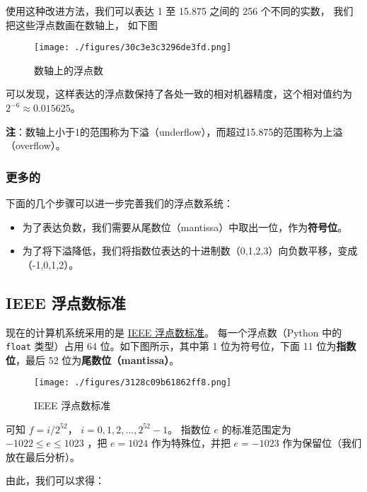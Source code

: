 使用这种改进方法，我们可以表达 1 至 15.875 之间的 256 个不同的实数， 我们把这些浮点数画在数轴上， 如下图

\begin{figure}[ht]
\centering
\texttt{[image: ./figures/30c3e3c3296de3fd.png]}
\caption{数轴上的浮点数} \label{fig_CmArit_2}
\end{figure}

可以发现，这样表达的浮点数保持了各处一致的相对机器精度，这个相对值约为 $2^{-6}\approx 0.015625$。

\textbf{注}：数轴上小于1的范围称为下溢（underflow），而超过15.875的范围称为上溢（overflow）。

\subsubsection{更多的}

下面的几个步骤可以进一步完善我们的浮点数系统：
\begin{itemize}
\item 为了表达负数，我们需要从尾数位（mantissa）中取出一位，作为\textbf{符号位}。 
\item 为了将下溢降低，我们将指数位表达的十进制数（0,1,2,3）向负数平移，变成（-1,0,1,2）。
\end{itemize}

\subsection{IEEE 浮点数标准}

现在的计算机系统采用的是 \href{https://ieeexplore.ieee.org/document/8766229}{IEEE 浮点数标准}。 每一个浮点数（Python 中的 \verb|float| 类型）占用 64 位。如下图所示，其中第 1 位为符号位，下面 11 位为\textbf{指数位}，最后 52 位为\textbf{尾数位（mantissa）}。

\begin{figure}[ht]
\centering
\texttt{[image: ./figures/3128c09b61862ff8.png]}
\caption{IEEE 浮点数标准} \label{fig_CmArit_3}
\end{figure}

可知 $f= {i}/{2^{52}}$， $i=0,1,2,...,2^{52}-1$。 指数位  $e$  的标准范围定为  $-1022\le e\le 1023$  ，把  $e=1024$  作为特殊位，并把  $e=-1023$  作为保留位（我们放在最后分析）。

由此，我们可以求得：

